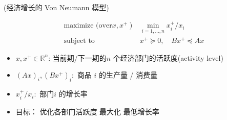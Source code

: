\documentclass[handout]{beamer}
\begin{document}
\begin{frame}
\begin{frame}
	\end{frame}
	
	
	\begin{frame}
		
			(经济增长的 Von Neumann 模型)
		
			\begin{equation}
				\begin{array}{ll}
					\text { maximize (over} \left.x, x^{+}\right) & \min _{i=1, \ldots, n} x_{i}^{+} / x_{i} \\
					\text { subject to } & x^{+} \succeq 0, \quad B x^{+} \preceq A x
				\end{array}
			\end{equation}
			\begin{itemize}[<+->]
				\item $x, x^{+} \in \mathbb{R}^{n}$: 
				当前期/下一期的$n$ 个经济部门的活跃度(activity level)
				
				\item $(A x)_{i},\left(B x^{+}\right)_{i}:$ 
				商品 $i$ 的生产量 / 消费量
				
				\item $x_{i}^{+} / x_{i}:$ 部门$i$ 的增长率 
				
				\item 目标： 优化各部门活跃度 最大化 最低增长率  
			\end{itemize}
		\end{frame}
	\fi

\end{frame}
\end{document}
